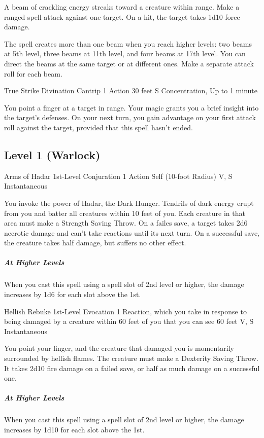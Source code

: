 \documentclass[letterpaper,openany,oneside,twocolumn]{book}
\begin{document}
A beam of crackling energy streaks toward a creature within range. Make a ranged spell attack against one target. On a hit, the target takes 1d10 force damage.

The spell creates more than one beam when you reach higher levels: two beams at 5th level, three beams at 11th level, and four beams at 17th level. You can direct the beams at the same target or at different ones. Make a separate attack roll for each beam.

\DndSpellHeader
  {True Strike}
  {Divination Cantrip}
  {1 Action}
  {30 feet}
  {S}
  {Concentration, Up to 1 minute}

You point a finger at a target in range. Your magic grants you a brief insight into the target's defenses. On your next turn, you gain advantage on your first attack roll against the target, provided that this spell hasn't ended.

\subsection*{Level 1 (Warlock)}

\DndSpellHeader
  {Arms of Hadar}
  {1st-Level Conjuration}
  {1 Action}
  {Self (10-foot Radius)}
  {V, S}
  {Instantaneous}

You invoke the power of Hadar, the Dark Hunger. Tendrils of dark energy erupt from you and batter all creatures within 10 feet of you. Each creature in that area must make a Strength Saving Throw. On a failes save, a target takes 2d6 necrotic damage and can't take reactions until its next turn. On a successful save, the creature takes half damage, but suffers no other effect.

\subparagraph*{At Higher Levels} When you cast this spell using a spell slot of 2nd level or higher, the damage increases by 1d6 for each slot above the 1st.

\DndSpellHeader
  {Hellish Rebuke}
  {1st-Level Evocation}
  {1 Reaction, which you take in response to being damaged by a creature within 60 feet of you that you can see}
  {60 feet}
  {V, S}
  {Instantaneous}

You point your finger, and the creature that damaged you is momentarily surrounded by hellish flames. The creature must make a Dexterity Saving Throw. It takes 2d10 fire damage on a failed save, or half as much damage on a successful one.

\subparagraph*{At Higher Levels} When you cast this spell using a spell slot of 2nd level or higher, the damage increases by 1d10 for each slot above the 1st.
\end{document}
